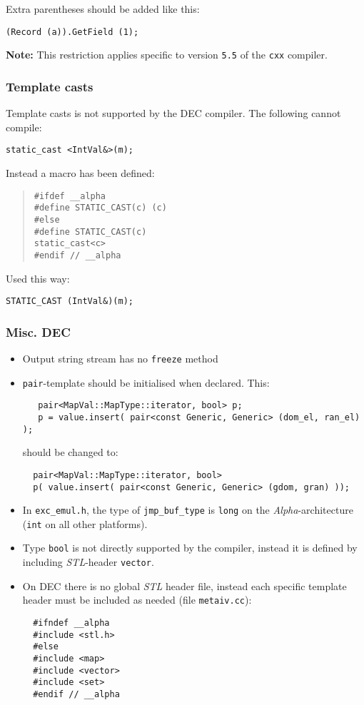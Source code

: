 \documentclass[11pt,a4paper]{article}
\begin{document}
Extra parentheses should be added like this:
\begin{verbatim}
(Record (a)).GetField (1);
\end{verbatim}

\textbf{Note:} This restriction applies specific to version
\texttt{5.5} of the \texttt{cxx} compiler.

\subsubsection{Template casts}

Template casts is not supported by the DEC compiler. The following
cannot compile:
\begin{verbatim}
static_cast <IntVal&>(m);
\end{verbatim}

Instead a macro has been defined:
\begin{quote}
\begin{verbatim}
#ifdef __alpha 
#define STATIC_CAST(c) (c) 
#else 
#define STATIC_CAST(c)
static_cast<c> 
#endif // __alpha
\end{verbatim}
\end{quote}
Used this way:
\begin{verbatim}
STATIC_CAST (IntVal&)(m);
\end{verbatim}


\subsubsection{Misc. DEC}

\begin{itemize}
\item Output string stream has no \texttt{freeze} method
\item \texttt{pair}-template should be initialised when
  declared. This:
\begin{verbatim}
   pair<MapVal::MapType::iterator, bool> p;
   p = value.insert( pair<const Generic, Generic> (dom_el, ran_el) );
\end{verbatim}
  should be changed to:
\begin{verbatim}
  pair<MapVal::MapType::iterator, bool> 
  p( value.insert( pair<const Generic, Generic> (gdom, gran) ));
\end{verbatim}
\item In \texttt{exc\_emul.h}, the type of \texttt{jmp\_buf\_type} is
  \texttt{long} on the \textit{Alpha}-architecture (\texttt{int} on
  all other platforms).
\item Type \texttt{bool} is not directly supported by the compiler,
  instead it is defined by including \textit{STL}-header
  \texttt{vector}. 
\item On DEC there is no global \textit{STL} header file, instead each
  specific template header must be included as needed (file
  \texttt{metaiv.cc}): 
\begin{verbatim}
  #ifndef __alpha
  #include <stl.h>
  #else
  #include <map>
  #include <vector>
  #include <set>
  #endif // __alpha
\end{verbatim}

\end{itemize}
\end{document}
